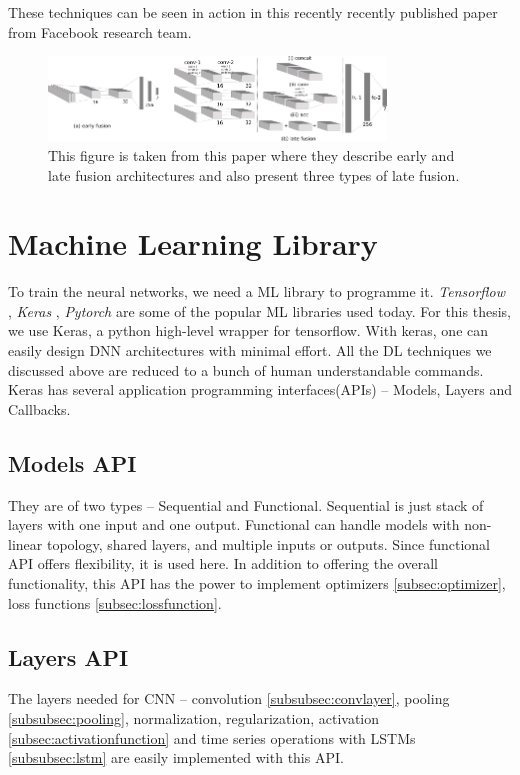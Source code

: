 These techniques can be seen in action in this recently \cite{wang2020makes} recently
published paper from Facebook research team.
\begin{figure}[h]
	\begin{center}
        \includegraphics[width=0.8\textwidth]{figures/inkscape/datafusion.png} %
	\end{center}
    \caption{This figure is taken from this \cite{Datafusion4} paper where they describe early and
        late fusion architectures and also present three types of late fusion.}
    \label{fig:Datafusiontypes}
\end{figure}


\section{Machine Learning Library}
To train the neural networks, we need a ML library to programme it. \textit{Tensorflow}
\cite{tensorflow},
\textit{Keras} \cite{Keras}, \textit{Pytorch} \cite{pyTorch} are some of the popular ML libraries used today.
For this thesis, we use Keras, a python high-level wrapper for tensorflow. With keras, one
can easily design DNN architectures with minimal effort. All the DL techniques we
discussed above are reduced to a bunch of human understandable commands.
Keras has several application programming interfaces(APIs) -- Models, Layers and
Callbacks.
\subsection{Models API}
They are of two types -- Sequential and Functional. Sequential is just stack of layers
with one input and one output. Functional can handle models with non-linear topology,
shared layers, and multiple inputs or outputs. Since functional API offers flexibility, it
is used here.
In addition to offering the overall functionality, this API has the power to implement
optimizers \ref{subsec:optimizer}, loss functions \ref{subsec:lossfunction}.

\subsection{Layers API}
The layers needed for CNN -- convolution \ref{subsubsec:convlayer}, pooling
\ref{subsubsec:pooling}, normalization, regularization,
activation \ref{subsec:activationfunction} and time series operations with LSTMs
\ref{subsubsec:lstm} are easily implemented with this API.

